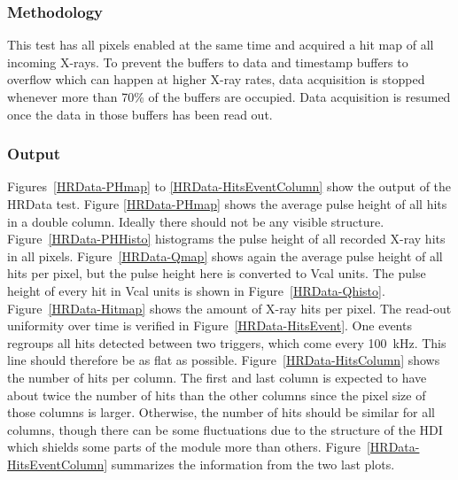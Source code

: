 \documentclass[a4paper,12pt,twoside]{article}
\begin{document}
\subsubsection{Methodology}
This test has all pixels enabled at the same time and acquired a hit map of all incoming X-rays. To prevent the buffers to data and timestamp buffers to overflow which can happen at higher X-ray rates, data acquisition is stopped whenever more than 70\% of the buffers are occupied. Data acquisition is resumed once the data in those buffers has been read out.
\subsubsection{Output}

Figures~\ref{HRData-PHmap} to \ref{HRData-HitsEventColumn} show the output of the HRData test. Figure \ref{HRData-PHmap} shows the average pulse height of all hits in a double column. Ideally there should not be any visible structure. Figure~\ref{HRData-PHHisto} histograms the pulse height of all recorded X-ray hits in all pixels. Figure~\ref{HRData-Qmap} shows again the average pulse height of all hits per pixel, but the pulse height here is converted to Vcal units. The pulse height of every hit in Vcal units is shown in Figure~\ref{HRData-Qhisto}. Figure~\ref{HRData-Hitmap} shows the amount of X-ray hits per pixel. The read-out uniformity over time is verified in Figure~\ref{HRData-HitsEvent}. One events regroups all hits detected between two triggers, which come every \SI{100}{\kilo\hertz}. This line should therefore be as flat as possible. Figure~\ref{HRData-HitsColumn} shows the number of hits per column. The first and last column is expected to have about twice the number of hits than the other columns since the pixel size of those columns is larger. Otherwise, the number of hits should be similar for all columns, though there can be some fluctuations due to the structure of the HDI which shields some parts of the module more than others. Figure~\ref{HRData-HitsEventColumn} summarizes the information from the two last plots.
\end{document}
